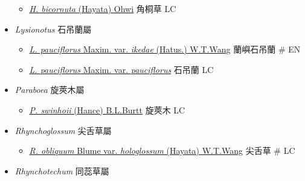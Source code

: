 \begin{itemize}
  \begin{itemize}
        \item[] \href{http://www.theplantlist.org/tpl1.1/search?q=Hemiboea+bicornuta}{\textit{H. bicornuta} (Hayata) Ohwi}   角桐草   LC
  \end{itemize}
 \item[] \textit{Lysionotus} 石吊蘭屬
                                
  \begin{itemize}
        \item[] \href{http://www.theplantlist.org/tpl1.1/search?q=Lysionotus+pauciflorus+var.+ikedae}{\textit{L. pauciflorus} Maxim. var. \textit{ikedae} (Hatus.) W.T.Wang}   蘭嶼石吊蘭  \# EN
        \item[] \href{http://www.theplantlist.org/tpl1.1/search?q=Lysionotus+pauciflorus+var.+pauciflorus}{\textit{L. pauciflorus} Maxim. var. \textit{pauciflorus}}   石吊蘭   LC
  \end{itemize}
 \item[] \textit{Paraboea} 旋莢木屬
                                
  \begin{itemize}
        \item[] \href{http://www.theplantlist.org/tpl1.1/search?q=Paraboea+swinhoii}{\textit{P. swinhoii} (Hance) B.L.Burtt}   旋莢木   LC
  \end{itemize}
 \item[] \textit{Rhynchoglossum} 尖舌草屬
                                
  \begin{itemize}
        \item[] \href{http://www.theplantlist.org/tpl1.1/search?q=Rhynchoglossum+obliquum+var.+hologlossum}{\textit{R. obliquum} Blume var. \textit{hologlossum} (Hayata) W.T.Wang}   尖舌草  \# LC
  \end{itemize}
 \item[] \textit{Rhynchotechum} 同蕊草屬
                                

\end{itemize}
